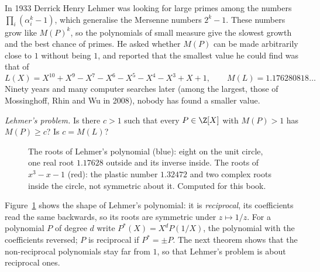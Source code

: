 In 1933 Derrick Henry Lehmer was looking for large primes among the numbers $\prod_i(\alpha_i^k-1)$, which generalise the Mersenne numbers $2^k-1$. These
numbers grow like $M(P)^k$, so the polynomials of small measure give the slowest growth and the best chance of primes. He asked whether $M(P)$ can be
made arbitrarily close to $1$ without being $1$, and reported that the smallest value he could find was that of
\[
L(X)=X^{10}+X^9-X^7-X^6-X^5-X^4-X^3+X+1,\qquad M(L)=1.176280818\ldots
\]
Ninety years and many computer searches later (among the largest, those of Mossinghoff, Rhin and Wu in 2008), nobody has found a smaller value.

\begin{center}
\emph{Lehmer's problem.} Is there $c>1$ such that every $P\in\Z[X]$ with $M(P)>1$ has $M(P)\ge c$? Is $c=M(L)$?
\end{center}

\begin{figure}[ht]
\centering
{}
\caption{The roots of Lehmer's polynomial (blue): eight on the unit circle, one real root $1.17628$ outside and its inverse inside. The roots of $x^3-x-1$
(red): the plastic number $1.32472$ and two complex roots inside the circle, not symmetric about it. Computed for this book.}
\label{conjectures:fig:lehmer}
\end{figure}

Figure~\ref{conjectures:fig:lehmer} shows the shape of Lehmer's polynomial: it is \emph{reciprocal}, its coefficients read the same backwards, so its roots are
symmetric under $z\mapsto1/z$. For a polynomial $P$ of degree $d$ write $P^*(X)=X^dP(1/X)$, the polynomial with the coefficients reversed; $P$ is reciprocal
if $P^*=\pm P$. The next theorem shows that the non-reciprocal polynomials stay far from $1$, so that Lehmer's problem is about reciprocal ones.


